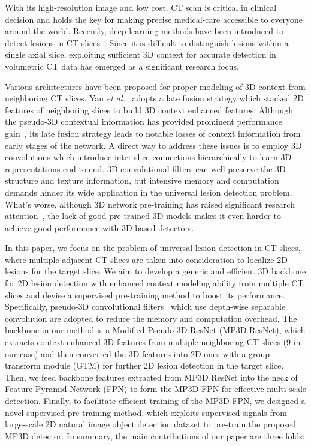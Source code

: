 \documentclass[runningheads]{llncs}
\begin{document}
With its high-resolution image and low cost, CT scan is critical in clinical decision and holds the key for making precise medical-care accessible to everyone around the world. 
Recently, deep learning methods have been introduced  to detect lesions in CT slices~\cite{3DCE,MSB, Retina, MVP, MULAN}. 
Since it is difficult to distinguish lesions within a single axial slice, exploiting sufficient 3D context for accurate detection in volumetric CT data has emerged as a significant research focus.


Various architectures have been proposed for proper modeling of 3D context from neighboring CT slices. 
Yan \textit{et al.}~\cite{3DCE} adopts a late fusion strategy which stacked 2D features of neighboring slices to build 3D context enhanced features. 
Although the pseudo-3D contextual information has provided prominent performance gain~\cite{3DCE,MSB, Retina, MVP, MULAN}, its late fusion strategy leads to notable losses of context information from early stages of the network.  
A direct way to address these issues is to employ 3D convolutions which introduce inter-slice connections hierarchically to learn 3D representations end to end. 3D convolutional filters can well preserve the 3D structure and texture information,  
but intensive memory and computation demands hinder its wide application in the universal lesion detection problem. 
What's worse, although 3D network pre-training has raised significant research attention~\cite{MG, Med3D,P3D,ACS}, the lack of good pre-trained 3D models makes it even harder to achieve good performance with 3D based detectors. 



In this paper, we focus on the problem of universal lesion detection in CT slices, where multiple adjacent CT slices are taken into consideration to localize 2D lesions for the target slice.
We aim to develop a generic and efficient 3D backbone for 2D lesion detection with enhanced context modeling ability from multiple CT slices and devise a supervised pre-training method to boost its performance. 
Specifically, pseudo-3D convolutional filters~\cite{P3D} which use depth-wise separable convolution are adopted to reduce the memory and computation overhead. 
The backbone in our method is a Modified Pseudo-3D ResNet (MP3D ResNet), which extracts context enhanced 3D features from multiple neighboring CT slices (9 in our case) and then converted the 3D features into 2D ones with a group transform module (GTM) for further 2D lesion detection in the target slice. 
Then, we feed backbone features extracted from MP3D ResNet into the neck of Feature Pyramid Network (FPN) to form the MP3D FPN for effective multi-scale detection. 
Finally, to facilitate efficient training of the MP3D FPN, we designed a novel supervised pre-training method, which exploits supervised signals from large-scale 2D natural image object detection dataset to pre-train the proposed MP3D detector. In summary, the main contributions of our paper are three folds:
\end{document}
